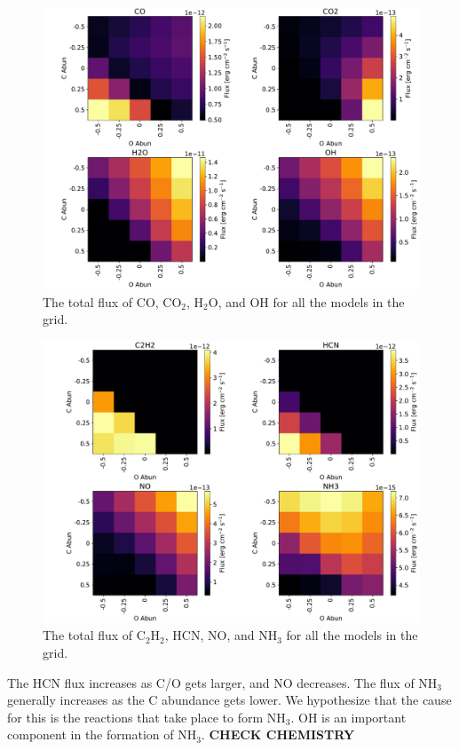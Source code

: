 \documentclass[twoside, single, authoryear, semicolon, 12pt]{lion-msc}
\newcommand{\4}{$_4$}
\newcommand{\3}{$_3$}
\newcommand{\2}{$_2$}
\begin{document}
\begin{figure}[H]
    \centering
    \includegraphics[width=\linewidth]{Figures/Heatmaps1.pdf}
    \caption{The total flux of CO, CO\2, H\2O, and OH for all the models in the grid.}
    \label{fig: Heatmaps1}
\end{figure}

\lipsum[1-2]
\begin{figure}[H]
    \centering
    \includegraphics[width=\linewidth]{Figures/Heatmaps2.pdf}
    \caption{The total flux of C\2H\2, HCN, NO, and NH\3 for all the models in the grid.}
    \label{fig: Heatmaps2}
\end{figure}

The HCN flux increases as C/O gets larger, and NO decreases. The flux of NH\3 generally increases as the C abundance gets lower. We hypothesize that the cause for this is the reactions that take place to form NH\3.
OH is an important component in the formation of NH\3. \textbf{CHECK CHEMISTRY}
\end{document}
